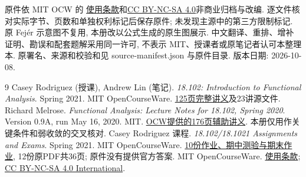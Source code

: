 原件依 MIT OCW 的 \href{https://ocw.mit.edu/pages/privacy-and-terms-of-use/}{使用条款}和\href{https://creativecommons.org/licenses/by-nc-sa/4.0/}{CC BY-NC-SA 4.0}非商业归档与改编. 逐文件核对实际字节、页数和单独权利标记后保存原件; 未发现主源中的第三方限制标记. 原 Fejér 示意图不复用, 本册改以公式生成的原生图展示. 中文翻译、重排、增补证明、勘误和配套题解采用同一许可, 不表示 MIT、授课者或原笔记者认可本整理本. 原署名、来源和校验和见 source-manifest.json 与原件目录. 版本日期: 2026-10-08.
\clearpage

\clearpage
\originalcontents
\clearpage
\mainmatter












\label{ch:assignments}













\begin{thebibliography}{9}
 Casey Rodriguez (授课), Andrew Lin (笔记). \textit{18.102: Introduction to Functional Analysis}. Spring 2021. MIT OpenCourseWare. \href{https://ocw.mit.edu/courses/18-102-introduction-to-functional-analysis-spring-2021/resources/complete-lecture-notes/}{125页完整讲义}及23讲源文件.
 Richard Melrose. \textit{Functional Analysis: Lecture Notes for 18.102, Spring 2020}. Version 0.9A, run May 16, 2020. MIT. \href{https://ocw.mit.edu/courses/18-102-introduction-to-functional-analysis-spring-2021/resources/mit18_102s20_lec_fa/}{OCW提供的176页辅助讲义}. 本册仅用作关键条件和弱收敛的交叉核对.
 Casey Rodriguez 课程. \textit{18.102/18.1021 Assignments and Exams}. Spring 2021. MIT OpenCourseWare. \href{https://ocw.mit.edu/courses/18-102-introduction-to-functional-analysis-spring-2021/pages/assignments-and-exams/}{10份作业、期中测验与期末作业}, 12份原PDF共36页; 原件没有提供官方答案.
 MIT OpenCourseWare. \href{https://ocw.mit.edu/pages/privacy-and-terms-of-use/}{使用条款}; \href{https://creativecommons.org/licenses/by-nc-sa/4.0/}{CC BY-NC-SA 4.0 International}.
\end{thebibliography}

